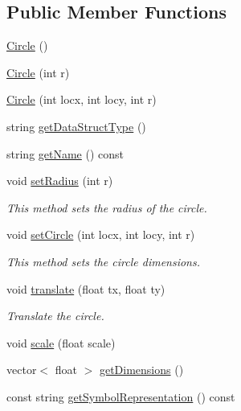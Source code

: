 \subsection*{Public Member Functions}
\begin{DoxyCompactItemize}
\item 
\mbox{\hyperlink{classbridges_1_1datastructure_1_1_circle_a2106fef85f001fbd2de2d9870a432ef8}{Circle}} ()
\item 
\mbox{\hyperlink{classbridges_1_1datastructure_1_1_circle_aafbf518a6d7defa3d69d46d4bdda41da}{Circle}} (int r)
\item 
\mbox{\hyperlink{classbridges_1_1datastructure_1_1_circle_acde4da631bd56847058a29f03417ea4e}{Circle}} (int locx, int locy, int r)
\item 
string \mbox{\hyperlink{classbridges_1_1datastructure_1_1_circle_a366d6a7488f926c1d63d6480fc52e791}{get\+Data\+Struct\+Type}} ()
\item 
string \mbox{\hyperlink{classbridges_1_1datastructure_1_1_circle_a3c7808f7918cb01ceaa3f6bf46e6bee5}{get\+Name}} () const
\item 
void \mbox{\hyperlink{classbridges_1_1datastructure_1_1_circle_a5b93bf688d56c7781390e6f207501313}{set\+Radius}} (int r)
\begin{DoxyCompactList}\small\item\em This method sets the radius of the circle. \end{DoxyCompactList}\item 
void \mbox{\hyperlink{classbridges_1_1datastructure_1_1_circle_ab9a1f6a9b76bb4e19b7f5c3e19a0f37f}{set\+Circle}} (int locx, int locy, int r)
\begin{DoxyCompactList}\small\item\em This method sets the circle dimensions. \end{DoxyCompactList}\item 
void \mbox{\hyperlink{classbridges_1_1datastructure_1_1_circle_ac21454141030b7c5af288ddbe2028111}{translate}} (float tx, float ty)
\begin{DoxyCompactList}\small\item\em Translate the circle. \end{DoxyCompactList}\item 
void \mbox{\hyperlink{classbridges_1_1datastructure_1_1_circle_a77c35a4e0a69f8ba1b71c0c40c727eab}{scale}} (float scale)
\item 
vector$<$ float $>$ \mbox{\hyperlink{classbridges_1_1datastructure_1_1_circle_a4e08c866e2f10945c16921454d49a030}{get\+Dimensions}} ()
\item 
const string \mbox{\hyperlink{classbridges_1_1datastructure_1_1_circle_a796c88ccb8c5529d45aa7271a34fa3fe}{get\+Symbol\+Representation}} () const
\end{DoxyCompactItemize}
